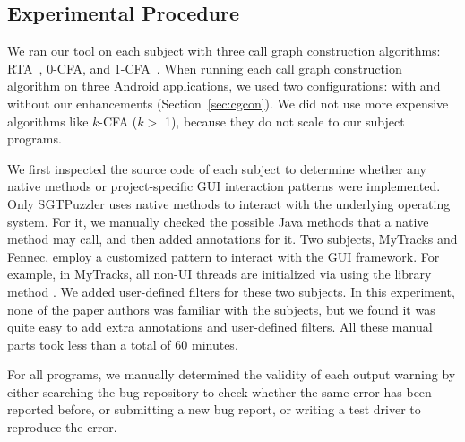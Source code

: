 \smallstep
\tinystep

\subsection{Experimental Procedure}
\label{sec:procedural}

We ran our tool on each subject with three call graph construction
algorithms: RTA~\cite{rta}, 0-CFA, and 1-CFA~\cite{kcfa}.  When running
each call graph construction algorithm on three Android applications, we
used two configurations: with and without our enhancements
(Section~\ref{sec:cgcon}).  We did not use more expensive algorithms like $k$-CFA ($k >$ 1),
because they do not scale to our subject programs.

We first inspected the source code of each subject to determine whether any
native methods or project-specific GUI interaction patterns were implemented.
Only SGTPuzzler uses native methods to interact with
the underlying operating system. For it, we manually checked the possible
Java methods that a native method may call, and then added \annotationnum {}
annotations for it. Two subjects, MyTracks and Fennec, employ a customized pattern
to interact with the GUI framework. For example, in MyTracks, all non-UI
threads are initialized via using the library method \discretionary{}{}{}.
We added \filternum user-defined filters for these two subjects.
In this experiment, none of the paper
authors was familiar with the subjects, but we found it was quite easy
to add extra annotations and user-defined filters. All these
manual parts took less than a total of 60 minutes.

For all \subnum programs, we manually determined the validity of each output warning
by either searching the
bug repository to check whether the same error has been reported before,
or submitting a new bug report, or writing a test driver to reproduce
the error.



